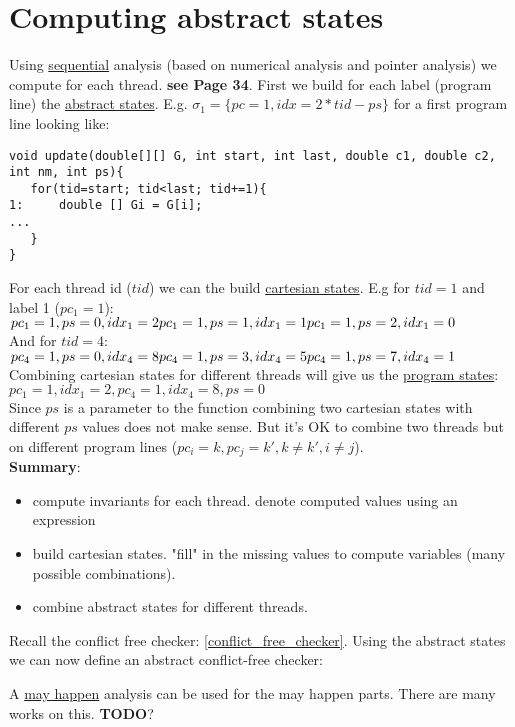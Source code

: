 \section{Computing abstract states}
Using \underline{sequential} analysis (based on numerical analysis and pointer analysis) we compute for each thread. \textbf{see Page 34}. First we build for each label (program line) the \underline{abstract states}. E.g. $\sigma_1=\{pc=1,idx=2*tid-ps\}$ for a first program line looking like: \begin{verbatim}
void update(double[][] G, int start, int last, double c1, double c2, int nm, int ps){
   for(tid=start; tid<last; tid+=1){
1:     double [] Gi = G[i];
...
   }
}
\end{verbatim}
For each thread id ($tid$) we can the build \underline{cartesian states}. E.g for $tid=1$ and label 1 ($pc_1=1$):\\
$pc_1=1,ps=0,idx_1=2\\
pc_1=1,ps=1,idx_1=1\\
pc_1=1,ps=2,idx_1=0$\\
And for $tid=4$:\\
$pc_4=1,ps=0,idx_4=8\\
pc_4=1,ps=3,idx_4=5\\
pc_4=1,ps=7,idx_4=1$\\
Combining cartesian states for different threads will give us the \underline{program states}: \\
$pc_1=1,idx_1=2,pc_4=1,idx_4=8,ps=0$ \\
Since $ps$ is a parameter to the function combining two cartesian states with different $ps$ values does not make sense. But it's OK to combine two threads but on different program lines ($pc_i=k,pc_j=k',k\neq k',i\neq j$).\\
\textbf{Summary}:
\begin{itemize}
\item compute invariants for each thread. denote computed values using an expression
\item build cartesian states. "fill" in the missing values to compute variables (many possible combinations).
\item combine abstract states for different threads.
\end{itemize}
Recall the conflict free checker: \ref{conflict_free_checker}. Using the abstract states we can now define an abstract conflict-free checker:

A \underline{may happen} analysis can be used for the may happen parts. There are many works on this. \textbf{TODO}?
